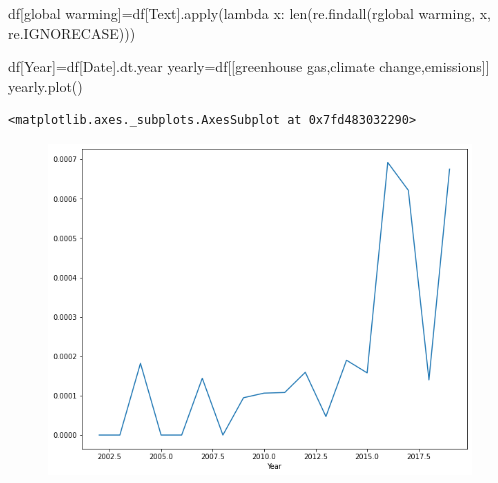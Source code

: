 \documentclass[
  letterpaper,
  DIV=11,
  numbers=noendperiod]{scrreprt}
\newenvironment{Shaded}{\begin{snugshade}}{\end{snugshade}}
\newcommand{\BuiltInTok}[1]{\textcolor[rgb]{0.00,0.23,0.31}{#1}}
\newcommand{\KeywordTok}[1]{\textcolor[rgb]{0.00,0.23,0.31}{#1}}
\newcommand{\NormalTok}[1]{\textcolor[rgb]{0.00,0.23,0.31}{#1}}
\newcommand{\OperatorTok}[1]{\textcolor[rgb]{0.37,0.37,0.37}{#1}}
\newcommand{\StringTok}[1]{\textcolor[rgb]{0.13,0.47,0.30}{#1}}
\newcommand{\VerbatimStringTok}[1]{\textcolor[rgb]{0.13,0.47,0.30}{#1}}
\begin{document}
\begin{Shaded}
\begin{Highlighting}[]
\NormalTok{df[}\StringTok{\textquotesingle{}global warming\textquotesingle{}}\NormalTok{]}\OperatorTok{=}\NormalTok{df[}\StringTok{\textquotesingle{}Text\textquotesingle{}}\NormalTok{].}\BuiltInTok{apply}\NormalTok{(}\KeywordTok{lambda}\NormalTok{ x: }\BuiltInTok{len}\NormalTok{(re.findall(}\VerbatimStringTok{r\textquotesingle{}global warming\textquotesingle{}}\NormalTok{, x, re.IGNORECASE)))}
\end{Highlighting}
\end{Shaded}

\begin{Shaded}
\begin{Highlighting}[]
\NormalTok{df[}\StringTok{\textquotesingle{}Year\textquotesingle{}}\NormalTok{]}\OperatorTok{=}\NormalTok{df[}\StringTok{\textquotesingle{}Date\textquotesingle{}}\NormalTok{].dt.year}
\NormalTok{yearly}\OperatorTok{=}\NormalTok{df[[}\StringTok{\textquotesingle{}greenhouse gas\textquotesingle{}}\NormalTok{,}\StringTok{\textquotesingle{}climate change\textquotesingle{}}\NormalTok{,}\StringTok{\textquotesingle{}emissions\textquotesingle{}}\NormalTok{]]}
\NormalTok{yearly.plot()}
\end{Highlighting}
\end{Shaded}

\begin{verbatim}
<matplotlib.axes._subplots.AxesSubplot at 0x7fd483032290>
\end{verbatim}

\begin{figure}[H]

{\centering \includegraphics{notebooks/W04. Natural Language Processing_files/figure-pdf/cell-15-output-2.png}

}

\end{figure}
\end{document}
